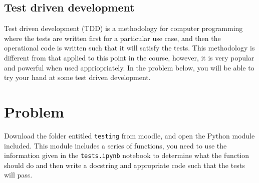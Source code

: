 \documentclass[a4paper]{article}
\begin{document}
\vspace{\baselineskip}
\begin{center}
	\noindent{}
\end{center}

\subsection{Test driven development}
Test driven development (TDD) is a methodology for computer programming where the tests are written first for a particular use case, and then the operational code is written such that it will satisfy the tests.
This methodology is different from that applied to this point in the course, however, it is very popular and powerful when used appriopriately.
In the problem below, you will be able to try your hand at some test driven development.

\section{Problem}
Download the folder entitled \texttt{testing} from moodle, and open the Python module included.
This module includes a series of functions, you need to use the information given in the \texttt{tests.ipynb} notebook to determine what the function should do and then write a docstring and appropriate code such that the tests will pass. 

%
%
\end{document}
